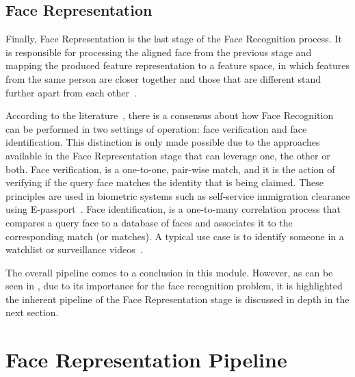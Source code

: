 \documentclass[class=report, crop=false, a4paper, 12pt]{standalone}
\begin{document}
\subsection{Face Representation}
\par Finally, Face Representation is the last stage of the Face Recognition process. It is responsible for processing the aligned face from the previous stage and mapping the produced feature representation to a feature space, in which features from the same person are closer together and those that are different stand further apart from each other~\autocite{duElementsEndtoendDeep2022}.
\par According to the literature~\autocite{duElementsEndtoendDeep2022,liHandbookFaceRecognition2011,ranjanDeepLearningUnderstanding2018,schroffFaceNetUnifiedEmbedding2015,wangDeepFaceRecognition2021}, there is a consensus about how Face Recognition can be performed in two settings of operation: face verification and face identification. This distinction is only made possible due to the approaches available in the Face Representation stage that can leverage one, the other or both. Face verification, is a one-to-one, pair-wise match, and it is the action of verifying if the query face matches the identity that is being claimed. These principles are used in biometric systems such as self-service immigration clearance using E-passport~\autocite{liHandbookFaceRecognition2011}. Face identification, is a one-to-many correlation process that compares a query face to a database of faces and associates it to the corresponding match (or matches). A typical use case is to identify someone in a watchlist or surveillance videos~\autocite{liHandbookFaceRecognition2011}.



\vspace{0.7\baselineskip}
\par The overall pipeline comes to a conclusion in this module. However, as can be seen in , due to its importance for the face recognition problem, it is highlighted the inherent pipeline of the Face Representation stage is discussed in depth in the next section.

\section{Face Representation Pipeline}
\end{document}
